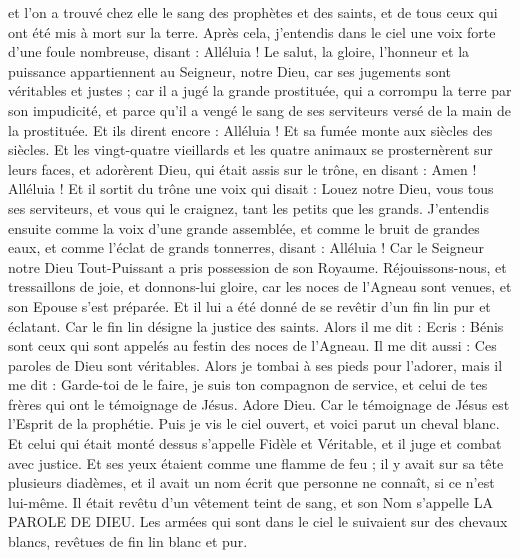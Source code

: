 \begin{multicols}{2}
et l'on a trouvé chez elle le sang des prophètes et des saints, et de tous ceux qui ont été mis à mort sur la terre.
\VerseOne{}Après cela, j'entendis dans le ciel une voix forte d'une foule nombreuse, disant : Alléluia ! Le salut, la gloire, l'honneur et la puissance appartiennent au Seigneur, notre Dieu,
car ses jugements sont véritables et justes ; car il a jugé la grande prostituée, qui a corrompu la terre par son impudicité, et parce qu'il a vengé le sang de ses serviteurs versé de la main de la prostituée.
Et ils dirent encore : Alléluia ! Et sa fumée monte aux siècles des siècles.
Et les vingt-quatre vieillards et les quatre animaux se prosternèrent sur leurs faces, et adorèrent Dieu, qui était assis sur le trône, en disant : Amen ! Alléluia !
Et il sortit du trône une voix qui disait : Louez notre Dieu, vous tous ses serviteurs, et vous qui le craignez, tant les petits que les grands.
J'entendis ensuite comme la voix d'une grande assemblée, et comme le bruit de grandes eaux, et comme l'éclat de grands tonnerres, disant : Alléluia ! Car le Seigneur notre Dieu Tout-Puissant a pris possession de son Royaume.
Réjouissons-nous, et tressaillons de joie, et donnons-lui gloire, car les noces de l'Agneau sont venues, et son Epouse s'est préparée.
Et il lui a été donné de se revêtir d'un fin lin pur et éclatant. Car le fin lin désigne la justice des saints.
Alors il me dit : Ecris : Bénis sont ceux qui sont appelés au festin des noces de l'Agneau. Il me dit aussi : Ces paroles de Dieu sont véritables.
Alors je tombai à ses pieds pour l'adorer, mais il me dit : Garde-toi de le faire, je suis ton compagnon de service, et celui de tes frères qui ont le témoignage de Jésus. Adore Dieu. Car le témoignage de Jésus est l'Esprit de la prophétie.
Puis je vis le ciel ouvert, et voici parut un cheval blanc. Et celui qui était monté dessus s'appelle Fidèle et Véritable, et il juge et combat avec justice.
Et ses yeux étaient comme une flamme de feu ; il y avait sur sa tête plusieurs diadèmes, et il avait un nom écrit que personne ne connaît, si ce n'est lui-même.
Il était revêtu d'un vêtement teint de sang, et son Nom s'appelle LA PAROLE DE DIEU.
Les armées qui sont dans le ciel le suivaient sur des chevaux blancs, revêtues de fin lin blanc et pur.

\end{multicols}
